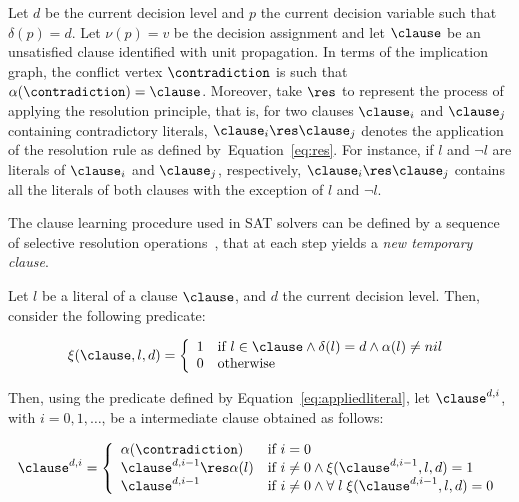 Let $d$ be the current decision level and $p$ the current decision variable such that
$\delta(p) = d$. Let $\nu(p) = v$ be the decision assignment and let $\clause$
be an unsatisfied clause identified with unit propagation. In terms of the
implication graph, the conflict vertex $\contradiction$ is such that
$\alpha(\contradiction) = \clause$. Moreover, take $\res$ to represent the
process of applying the resolution principle, that is, for two clauses
$\clause_i$ and $\clause_j$ containing contradictory literals, $\clause_i \res
\clause_j$ denotes the application of the resolution rule as defined
by~Equation~\ref{eq:res}. For instance, if $l$ and $\neg l$ are literals of
$\clause_i$ and $\clause_j$, respectively, $\clause_i \res \clause_j$ contains
all the literals of both clauses with the exception of $l$ and $\neg l$.

The clause learning procedure used in SAT solvers can be defined by a sequence
of selective resolution operations~\cite{journals/corr/abs-1107-0044,DAC00*675},
that at each step yields a \emph{new temporary clause}. 

\begin{definition}%
\label{def:clauselearning}

    Let $l$ be a literal of a clause $\clause$, and $d$ the current decision
    level. Then, consider the following predicate:

    \begin{equation}%
        \label{eq:appliedliteral}
        \xi(\clause, l, d) = 
        \left\{
            \begin{array}{ll}
                1 & \text{if $l \in \clause \land \delta(l) = d \land \alpha(l) \neq nil$} \\
                0 & \text{otherwise}
            \end{array}
        \right.
    \end{equation}

    Then, using the predicate defined by Equation~\ref{eq:appliedliteral}, let
    $\clause^{d,i}$, with $i = 0, 1, \ldots$, be a intermediate clause obtained
    as follows:

    \begin{equation}%
        \label{eq:newclause}
        \clause^{d,i} = 
        \left\{
            \begin{array}{ll}
                \alpha(\contradiction) & \text{if $i=0$}\\
                \clause^{d,i-1} \res \alpha(l) & \text{if $i \neq 0 \land \xi(\clause^{d,i-1}, l, d) = 1$}\\
                \clause^{d, i-1} & \text{if $i \neq 0 \land \forall\;l\;\xi(\clause^{d, i-1}, l, d) = 0$}
            \end{array}
        \right.
    \end{equation}

\end{definition}

